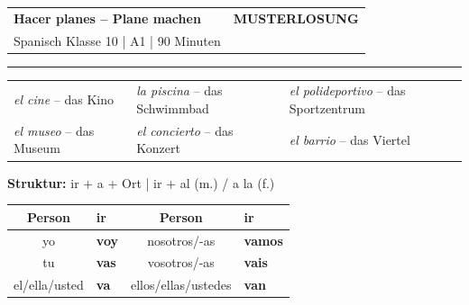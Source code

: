 \documentclass[11pt,a4paper]{article}
\newcommand{\lsg}[1]{\textcolor{loesung}{\textbf{#1}}}
\newcommand{\es}[1]{\textit{#1}}
\begin{document}
\noindent
\begin{tabularx}{\textwidth}{@{}Xr@{}}
    {\Large\textbf{\textcolor{spanisch}{Hacer planes -- Plane machen}}} & \textcolor{loesung}{\Large\textbf{MUSTERLOSUNG}} \\[0.3em]
    {\small Spanisch Klasse 10 | A1 | 90 Minuten} & \\
\end{tabularx}

\vspace{0.3em}
\hrule
\vspace{0.6em}

\begin{vokabelkasten}
\begin{tabularx}{\textwidth}{@{}XXX@{}}
\es{el cine} -- das Kino & \es{la piscina} -- das Schwimmbad & \es{el polideportivo} -- das Sportzentrum \\
\es{el museo} -- das Museum & \es{el concierto} -- das Konzert & \es{el barrio} -- das Viertel \\
\end{tabularx}
\end{vokabelkasten}

\vspace{0.5em}

\begin{merkkasten}
\vspace{0.2em}
\textbf{Struktur:} ir + a + Ort \quad | \quad ir + al (m.) / a la (f.)

\vspace{0.3em}
\begin{tabularx}{\textwidth}{@{}|c|X|c|X|@{}}
\hline
\rowcolor{hellgrau}
\textbf{Person} & \textbf{ir} & \textbf{Person} & \textbf{ir} \\
\hline
yo & \lsg{voy} & nosotros/-as & \lsg{vamos} \\
\hline
tu & \lsg{vas} & vosotros/-as & \lsg{vais} \\
\hline
el/ella/usted & \lsg{va} & ellos/ellas/ustedes & \lsg{van} \\
\hline
\end{tabularx}
\end{merkkasten}
\end{document}
